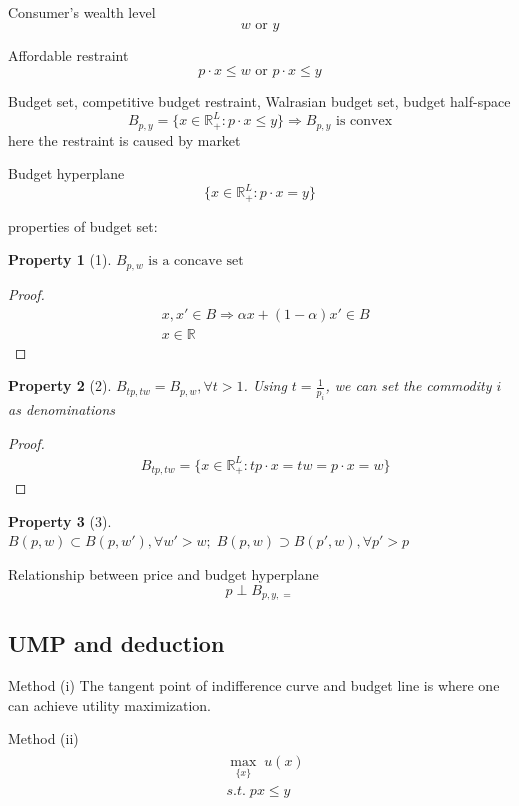 \documentclass{article}
\newtheorem{property}{Property}
\begin{document}
Consumer's wealth level
$$w\text{ or } y$$

Affordable restraint
$$p\cdot x\leqslant w \text{ or } p\cdot x\leqslant y$$

Budget set, competitive budget restraint, Walrasian budget set, budget half-space
$$B_{p,y}=\{x\in \mathbb{R}_{+}^{L}:p\cdot x\leqslant y\} \Rightarrow B_{p,y} \text{ is convex}$$
here the restraint is caused by market

Budget hyperplane
$$\{x\in \mathbb{R}_{+}^{L}:p\cdot x= y\}$$

properties of budget set:

\begin{property}[1]
$B_{p,w} \text{ is a concave set}$
\end{property}

\begin{proof}
\begin{align}
&x,x' \in B \Rightarrow \alpha x +(1-\alpha)x' \in B
\\&x\in \mathbb{R}
\end{align}
\end{proof}

\begin{property}[2]
$B_{tp,tw} =B_{p,w}, \forall t >1$. Using $t=\frac{1}{p_{i}}$, we can set the commodity $i$ as denominations
\end{property}

\begin{proof}
\begin{align}
&B_{tp,tw}=\{x\in \mathbb{R}_{+}^{L}:tp\cdot x= tw=p\cdot x=w\}
\end{align}
\end{proof}

\begin{property}[3]
$B(p,w)\subset B(p,w'), \forall w' >w;\; B(p,w)\supset B(p',w), \forall p' >p$
\end{property}

Relationship between price and budget hyperplane
$$p \perp B_{p,y,=}$$


\subsection{UMP and deduction}

Method (i)
The tangent point of indifference curve and budget line is where one can achieve utility maximization.

Method (ii)
\begin{align}
\begin{split}
& \mathop{max}_{\{x\}} \;u(x)
\\&s.t.\; px \leqslant y
\end{split}
\end{align}
\end{document}
